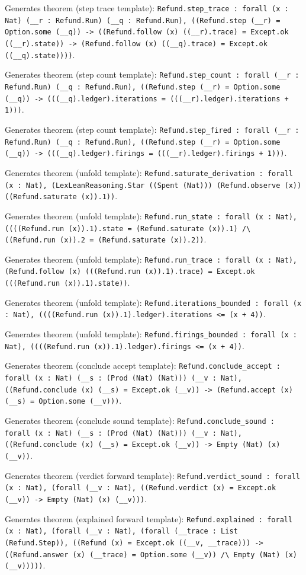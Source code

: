 \documentclass[11pt]{article}
\begin{document}
\noindent Generates theorem (step trace template): \texttt{Refund.step\_trace : forall (x : Nat) (\_\_r : Refund.Run) (\_\_q : Refund.Run), ((Refund.step (\_\_r) = Option.some (\_\_q)) -> ((Refund.follow (x) ((\_\_r).trace) = Except.ok ((\_\_r).state)) -> (Refund.follow (x) ((\_\_q).trace) = Except.ok ((\_\_q).state))))}.\par
\noindent Generates theorem (step count template): \texttt{Refund.step\_count : forall (\_\_r : Refund.Run) (\_\_q : Refund.Run), ((Refund.step (\_\_r) = Option.some (\_\_q)) -> (((\_\_q).ledger).iterations = (((\_\_r).ledger).iterations + 1)))}.\par
\noindent Generates theorem (step count template): \texttt{Refund.step\_fired : forall (\_\_r : Refund.Run) (\_\_q : Refund.Run), ((Refund.step (\_\_r) = Option.some (\_\_q)) -> (((\_\_q).ledger).firings = (((\_\_r).ledger).firings + 1)))}.\par
\noindent Generates theorem (unfold template): \texttt{Refund.saturate\_derivation : forall (x : Nat), (LexLeanReasoning.Star ((Spent (Nat))) (Refund.observe (x)) ((Refund.saturate (x)).1))}.\par
\noindent Generates theorem (unfold template): \texttt{Refund.run\_state : forall (x : Nat), ((((Refund.run (x)).1).state = (Refund.saturate (x)).1) /\textbackslash{} ((Refund.run (x)).2 = (Refund.saturate (x)).2))}.\par
\noindent Generates theorem (unfold template): \texttt{Refund.run\_trace : forall (x : Nat), (Refund.follow (x) (((Refund.run (x)).1).trace) = Except.ok (((Refund.run (x)).1).state))}.\par
\noindent Generates theorem (unfold template): \texttt{Refund.iterations\_bounded : forall (x : Nat), ((((Refund.run (x)).1).ledger).iterations <= (x + 4))}.\par
\noindent Generates theorem (unfold template): \texttt{Refund.firings\_bounded : forall (x : Nat), ((((Refund.run (x)).1).ledger).firings <= (x + 4))}.\par
\noindent Generates theorem (conclude accept template): \texttt{Refund.conclude\_accept : forall (x : Nat) (\_\_s : (Prod (Nat) (Nat))) (\_\_v : Nat), ((Refund.conclude (x) (\_\_s) = Except.ok (\_\_v)) -> (Refund.accept (x) (\_\_s) = Option.some (\_\_v)))}.\par
\noindent Generates theorem (conclude sound template): \texttt{Refund.conclude\_sound : forall (x : Nat) (\_\_s : (Prod (Nat) (Nat))) (\_\_v : Nat), ((Refund.conclude (x) (\_\_s) = Except.ok (\_\_v)) -> Empty (Nat) (x) (\_\_v))}.\par
\noindent Generates theorem (verdict forward template): \texttt{Refund.verdict\_sound : forall (x : Nat), (forall (\_\_v : Nat), ((Refund.verdict (x) = Except.ok (\_\_v)) -> Empty (Nat) (x) (\_\_v)))}.\par
\noindent Generates theorem (explained forward template): \texttt{Refund.explained : forall (x : Nat), (forall (\_\_v : Nat), (forall (\_\_trace : List (Refund.Step)), ((Refund (x) = Except.ok ((\_\_v, \_\_trace))) -> ((Refund.answer (x) (\_\_trace) = Option.some (\_\_v)) /\textbackslash{} Empty (Nat) (x) (\_\_v)))))}.\par
\end{document}
